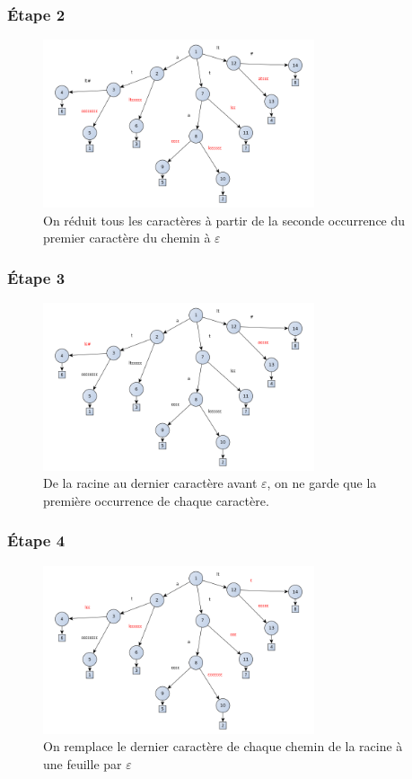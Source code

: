 \documentclass[a4paper]{article}
\begin{document}
\subsubsection{Étape 2}

\begin{figure}[H]
\centering
\includegraphics[width=80mm]{./slides/img/construction-1.png}
\caption{On réduit tous les caractères à partir de la seconde occurrence du premier caractère du chemin à $\varepsilon$}
\label{overflow}
\end{figure}

\subsubsection{Étape 3}

\begin{figure}[H]
\centering
\includegraphics[width=80mm]{./slides/img/construction-2.png}
\caption{De la racine au dernier caractère avant $\varepsilon$, on ne garde que la première occurrence de chaque caractère.}
\label{overflow}
\end{figure}

\subsubsection{Étape 4}

\begin{figure}[H]
\centering
\includegraphics[width=80mm]{./slides/img/construction-3.png}
\caption{On remplace le dernier caractère de chaque chemin de la racine à une feuille par $\varepsilon$}
\label{overflow}
\end{figure}
\end{document}
